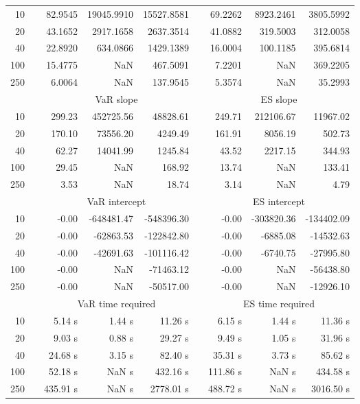 {{\begin{longtable}{rr rrr r rrr}
10 &&  82.9545 & 19045.9910 & 15527.8581 & & 69.2262 & 8923.2461 & 3805.5992 \\ 
20 &&  43.1652 & 2917.1658 & 2637.3514 & & 41.0882 & 319.5003 & 312.0058 \\ 
40 &&  22.8920 & 634.0866 & 1429.1389 & & 16.0004 & 100.1185 & 395.6814 \\ 
100 &&  15.4775 &    NaN & 467.5091 & & 7.2201 &    NaN & 369.2205 \\ 
250 &&  6.0064 &    NaN & 137.9545 & & 5.3574 &    NaN & 35.2993 \\ 
\hline 
 & & \multicolumn{3}{c}{ VaR slope} && \multicolumn{3}{c}{ES slope} \\ \cline{3-5}  \cline{7-9}
10 && 299.23 & 452725.56 & 48828.61 && 249.71 & 212106.67 & 11967.02 \\ 
20 && 170.10 & 73556.20 & 4249.49 && 161.91 & 8056.19 & 502.73 \\ 
40 && 62.27 & 14041.99 & 1245.84 && 43.52 & 2217.15 & 344.93 \\ 
100 && 29.45 &  NaN & 168.92 && 13.74 &  NaN & 133.41 \\ 
250 && 3.53 &  NaN & 18.74 && 3.14 &  NaN & 4.79 \\ 
\hline 
 & & \multicolumn{3}{c}{ VaR intercept} &&  \multicolumn{3}{c}{ES intercept} \\ \cline{3-5}  \cline{7-9}
10 &&  -0.00 & -648481.47 & -548396.30 && -0.00 & -303820.36 & -134402.09 \\ 
20 &&  -0.00 & -62863.53 & -122842.80 && -0.00 & -6885.08 & -14532.63 \\ 
40 &&  -0.00 & -42691.63 & -101116.42 && -0.00 & -6740.75 & -27995.80 \\ 
100 &&  -0.00 &  NaN & -71463.12 && -0.00 &  NaN & -56438.80 \\ 
250 &&  -0.00 &  NaN & -50517.00 && -0.00 &  NaN & -12926.10 \\ 
\hline 
 & & \multicolumn{3}{c}{VaR time required} && \multicolumn{3}{c}{ES time required} \\ \cline{3-5}  \cline{7-9}
10 & & 5.14 s & 1.44 s & 11.26 s && 6.15 s & 1.44 s & 11.36 s \\ 
20 & & 9.03 s & 0.88 s & 29.27 s && 9.49 s & 1.05 s & 31.96 s \\ 
40 & & 24.68 s & 3.15 s & 82.40 s && 35.31 s & 3.73 s & 85.62 s \\ 
100 & & 52.18 s &  NaN s & 432.16 s && 111.86 s &  NaN s & 434.58 s \\ 
250 & & 435.91 s &  NaN s & 2778.01 s && 488.72 s &  NaN s & 3016.50 s \\ 

\end{longtable}}}
